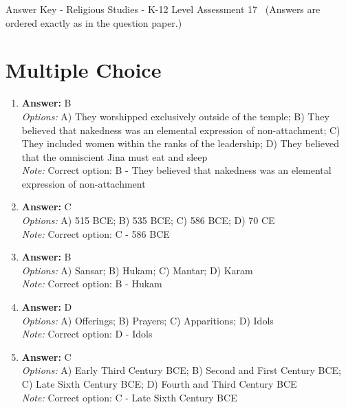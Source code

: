 \documentclass[12pt]{article}
\begin{document}
\begin{center}
Answer Key - Religious Studies - K-12 Level Assessment 17 \
\small (Answers are ordered exactly as in the question paper.)
\end{center}

\section*{Multiple Choice}
\begin{enumerate}[label=\arabic*.]
\item \textbf{Answer:} B
\\ \textit{Options:} A) They worshipped exclusively outside of the temple; B) They believed that nakedness was an elemental expression of non-attachment; C) They included women within the ranks of the leadership; D) They believed that the omniscient Jina must eat and sleep
\\ \textit{Note:} Correct option: B - They believed that nakedness was an elemental expression of non-attachment
\item \textbf{Answer:} C
\\ \textit{Options:} A) 515 BCE; B) 535 BCE; C) 586 BCE; D) 70 CE
\\ \textit{Note:} Correct option: C - 586 BCE
\item \textbf{Answer:} B
\\ \textit{Options:} A) Sansar; B) Hukam; C) Mantar; D) Karam
\\ \textit{Note:} Correct option: B - Hukam
\item \textbf{Answer:} D
\\ \textit{Options:} A) Offerings; B) Prayers; C) Apparitions; D) Idols
\\ \textit{Note:} Correct option: D - Idols
\item \textbf{Answer:} C
\\ \textit{Options:} A) Early Third Century BCE; B) Second and First Century BCE; C) Late Sixth Century BCE; D) Fourth and Third Century BCE
\\ \textit{Note:} Correct option: C - Late Sixth Century BCE
\end{enumerate}
\end{document}

